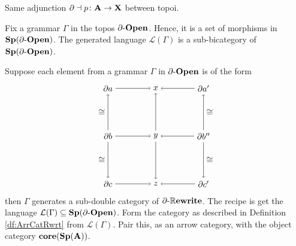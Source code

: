 \documentclass{amsart}
\begin{document}
Same adjunction $ \partial \dashv p \colon \mathbf{A} \to \mathbf{X} $ between topoi.
 
\begin{df}
	Fix a grammar $ \Gamma $ in the topos $ \partial \text{-} \mathbf{Open} $. Hence, it is a set of morphisms in $ \mathbf{Sp}(\partial \text{-} \mathbf{Open}) $.  The generated  language $ \mathcal{L}(\Gamma) $ is a sub-bicategory of $ \mathbf{Sp}(\partial \text{-} \mathbf{Open}) $. 
\end{df}

\begin{thm}
	Suppose each element from a grammar $ \Gamma $ in $ \partial \text{-} \mathbf{Open} $ is of the form 
	\[
	\begin{tikzpicture}
		\node (a) at (-1,1) {$ \partial a $};
		\node (x) at (1,1) {$ x $};
		\node (a') at (3,1) {$ \partial a' $};
		\node (b) at (-1,-1) {$ \partial b $};
		\node (y) at (1,-1) {$ y $};
		\node (b') at (3,-1) {$ \partial b'' $};
		\node (c) at (-1,-3) {$ \partial c $};
		\node (z) at (1,-3) {$ z $};
		\node (c') at (3,-3) {$ \partial c' $};
		\draw [->] (a) to (x);
		\draw [->] (a') to (x);
		\draw [->] (b) to (y);
		\draw [->] (b') to (y);
		\draw [->] (c) to (z);
		\draw [->] (c') to (z);
		\draw [->] (b) to node [left] {$ \cong $} (a);
		\draw [->] (b) to node [left] {$ \cong $} (c);
		\draw [->] (y) to (x);
		\draw [->] (y) to (z);
		\draw [->] (b') to node [right] {$ \cong $} (a');
		\draw [->] (b') to node [right] {$ \cong $} (c');
	\end{tikzpicture}
	\]
	then $ \Gamma $ generates a sub-double category of $ \partial \text{-} \mathbb{R}\mathbf{ewrite} $.   The recipe is get the language $ \mathcal{L}(\Gamma)  \subseteq \mathbf{Sp}(\partial \text{-} \mathbf{Open}) $. Form the category as described in Definition \ref{df:ArrCatRwrt} from $ \mathcal{L}(\Gamma) $. Pair this, as an arrow category, with the object category $ \mathbf{core}(\mathbf{Sp}(\mathbf{A})) $.  
\end{thm}
\end{document}
